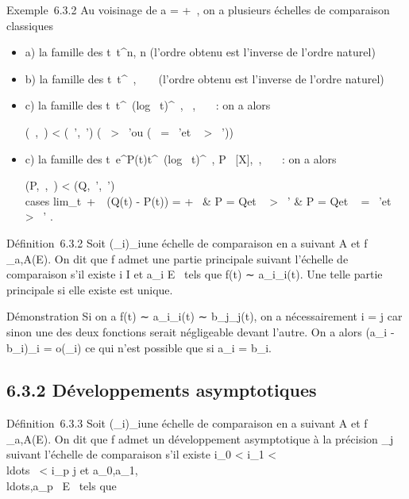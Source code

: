 \documentclass[]{article}
\begin{document}
Exemple~6.3.2 Au voisinage de a = +\infty~, on a plusieurs échelles de
comparaison classiques

\begin{itemize}
\item
  a) la famille des t\mapsto~t^n, n \in {}
  (l'ordre obtenu est l'inverse de l'ordre naturel)
\item
  b) la famille des t\mapsto~t^\alpha~, \alpha~ \in {}~
  (l'ordre obtenu est l'inverse de l'ordre naturel)
\item
  c) la famille des
  t\mapsto~t^\alpha~(log~
  t)^\beta~, \alpha~,\beta~ \in {}~~: on a alors

  (\alpha~,\beta~) < (\alpha~',\beta~') \Leftrightarrow
  \bigl (\alpha~ > \alpha~'\text ou
  (\alpha~ = \alpha~'\text et \beta~ >
  \beta~')\bigr )
\item
  c) la famille des
  t\mapsto~e^P(t)t^\alpha~(log~
  t)^\beta~, P \in {}~[X],\alpha~,\beta~ \in {}~~: on a alors

  (P,\alpha~,\beta~) < (Q,\alpha~',\beta~') \Leftrightarrow
  \left \\cases
  lim_t\rightarrow~+\infty~~(Q(t) - P(t)) = +\infty~
  \cr \cr \textou &
  \cr P = Q\text et \alpha~ >
  \alpha~' \cr \textou & \cr
  P = Q\text et \alpha~ = \alpha~'\text et \beta~
  > \beta~'  \right .
\end{itemize}

Définition~6.3.2 Soit (\phi_i)_i\inI une échelle de
comparaison en a suivant A et f _a,A(E). On dit que f admet
une partie principale suivant l'échelle de comparaison s'il existe i \in I
et a_i \in E \diagdown\0\ tels que f(t)
∼ a_i\phi_i(t). Une telle partie principale si elle
existe est unique.

Démonstration Si on a f(t) ∼ a_i\phi_i(t) ∼
b_j\phi_j(t), on a nécessairement i = j car sinon une des
deux fonctions serait négligeable devant l'autre. On a alors
(a_i - b_i)\phi_i = o(\phi_i) ce qui n'est
possible que si a_i = b_i.

\subsection{6.3.2 Développements asymptotiques}

Définition~6.3.3 Soit (\phi_i)_i\inI une échelle de
comparaison en a suivant A et f _a,A(E). On dit que f admet
un développement asymptotique à la précision \phi_j suivant
l'échelle de comparaison s'il existe i_0 <
i_1 <
\\ldots~ <
i_p \leq j et
a_0,a_1,\\ldots,a_p~
\in E \diagdown\0\ tels que
\end{document}
